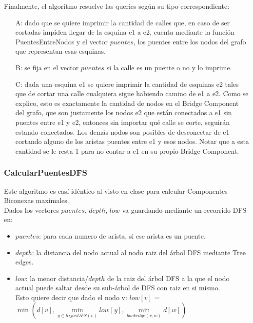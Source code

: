 Finalmente, el algoritmo resuelve las queries según su tipo correspondiente:
\begin{itemize}
	\item[A: ] dado que se quiere imprimir la cantidad de calles que, en caso de ser cortadas impiden llegar de la 
	esquina e1 a e2, cuenta mediante la función PuentesEntreNodos y el vector $puentes$, los puentes entre los nodos 
	del grafo que representan esas esquinas.
	\item[B: ] se fija en el vector $puentes$ si la calle es un puente o no y lo imprime.
	\item[C: ] dada una esquina e1 se quiere imprimir la cantidad de esquinas e2 tales que de cortar una calle cualquiera 
	sigue habiendo camino de e1 a e2. Como se explico, esto es exactamente la cantidad de nodos en el Bridge Component del
	grafo, que son justamente los nodos e2 que están conectados a e1 sin puentes entre e1 y e2, entonces sin importar
	qué calle se corte, seguirán estando conectados. Los demás nodos son posibles de desconectar de e1 cortando alguno
	de los aristas puentes entre e1 y esos nodos. Notar que a esta cantidad se le resta 1 para no contar a e1 en su 
	propio Bridge Component.
\end{itemize}

\subsubsection*{CalcularPuentesDFS}

Este algoritmo es cas\'i idéntico al visto en clase para calcular Componentes Biconexas maximales. \\

Dados los vectores $puentes$, $depth$, $low$ va guardando mediante un recorrido DFS en:
\begin{itemize}
	\item $puentes$: para cada numero de arista, si ese arista es un puente.
	\item $depth$: la distancia del nodo actual al nodo raiz del \'arbol DFS mediante Tree edges.
	\item $low$: la menor distancia/$depth$ de la raiz del \'arbol DFS a la que el nodo actual puede saltar
	desde su sub-\'arbol de DFS con raiz en si mismo. \\
	Esto quiere decir que dado el nodo v: $low[v]$ = $\min(d[v], \min\limits_{y \in hijosDFS(v)} low[y], \min\limits_{backedge(v,w)} d[w])$
\end{itemize}

